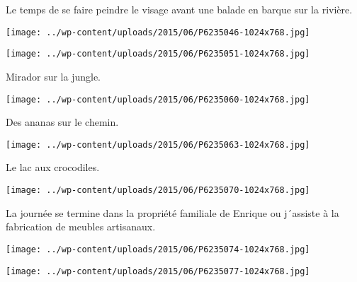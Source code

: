  

 Le temps de se faire peindre le visage avant une balade en barque sur la rivière. 

 

\begin{center} \texttt{[image: ../wp-content/uploads/2015/06/P6235046-1024x768.jpg]} \end{center}

 

 

\begin{center} \texttt{[image: ../wp-content/uploads/2015/06/P6235051-1024x768.jpg]} \end{center}

 

 Mirador sur la jungle. 

 

\begin{center} \texttt{[image: ../wp-content/uploads/2015/06/P6235060-1024x768.jpg]} \end{center}

 

 Des ananas sur le chemin. 

 

\begin{center} \texttt{[image: ../wp-content/uploads/2015/06/P6235063-1024x768.jpg]} \end{center}

 

 Le lac aux crocodiles. 

 

\begin{center} \texttt{[image: ../wp-content/uploads/2015/06/P6235070-1024x768.jpg]} \end{center}

 

 La journée se termine dans la propriété familiale de Enrique ou j´assiste à la fabrication de meubles artisanaux. 

 

\begin{center} \texttt{[image: ../wp-content/uploads/2015/06/P6235074-1024x768.jpg]} \end{center}

 

 

\begin{center} \texttt{[image: ../wp-content/uploads/2015/06/P6235077-1024x768.jpg]} \end{center}

